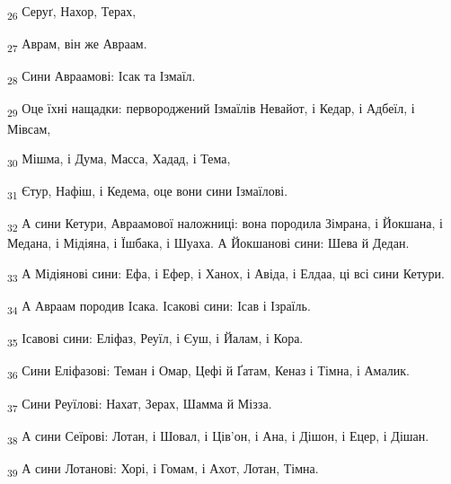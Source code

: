 \begin{tcolorbox}
\textsubscript{26} Серуґ, Нахор, Терах,
\end{tcolorbox}
\begin{tcolorbox}
\textsubscript{27} Аврам, він же Авраам.
\end{tcolorbox}
\begin{tcolorbox}
\textsubscript{28} Сини Авраамові: Ісак та Ізмаїл.
\end{tcolorbox}
\begin{tcolorbox}
\textsubscript{29} Оце їхні нащадки: первороджений Ізмаїлів Невайот, і Кедар, і Адбеїл, і Мівсам,
\end{tcolorbox}
\begin{tcolorbox}
\textsubscript{30} Мішма, і Дума, Масса, Хадад, і Тема,
\end{tcolorbox}
\begin{tcolorbox}
\textsubscript{31} Єтур, Нафіш, і Кедема, оце вони сини Ізмаїлові.
\end{tcolorbox}
\begin{tcolorbox}
\textsubscript{32} А сини Кетури, Авраамової наложниці: вона породила Зімрана, і Йокшана, і Медана, і Мідіяна, і Їшбака, і Шуаха. А Йокшанові сини: Шева й Дедан.
\end{tcolorbox}
\begin{tcolorbox}
\textsubscript{33} А Мідіянові сини: Ефа, і Ефер, і Ханох, і Авіда, і Елдаа, ці всі сини Кетури.
\end{tcolorbox}
\begin{tcolorbox}
\textsubscript{34} А Авраам породив Ісака. Ісакові сини: Ісав і Ізраїль.
\end{tcolorbox}
\begin{tcolorbox}
\textsubscript{35} Ісавові сини: Еліфаз, Реуїл, і Єуш, і Йалам, і Кора.
\end{tcolorbox}
\begin{tcolorbox}
\textsubscript{36} Сини Еліфазові: Теман і Омар, Цефі й Ґатам, Кеназ і Тімна, і Амалик.
\end{tcolorbox}
\begin{tcolorbox}
\textsubscript{37} Сини Реуїлові: Нахат, Зерах, Шамма й Мізза.
\end{tcolorbox}
\begin{tcolorbox}
\textsubscript{38} А сини Сеїрові: Лотан, і Шовал, і Ців'он, і Ана, і Дішон, і Ецер, і Дішан.
\end{tcolorbox}
\begin{tcolorbox}
\textsubscript{39} А сини Лотанові: Хорі, і Гомам, і Ахот, Лотан, Тімна.
\end{tcolorbox}
